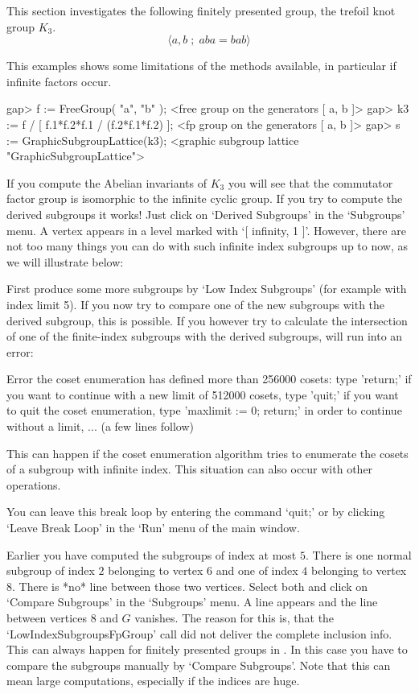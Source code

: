 
This  section  investigates the  following  finitely presented group, the
trefoil knot group $K_3$.
$$
    \langle a, b \;;\; aba = bab \rangle
$$

This examples shows some  limitations   of the methods available,   in
particular if infinite factors occur.

\begintt
gap> f := FreeGroup( "a", "b" );
<free group on the generators [ a, b ]>
gap> k3 := f / [ f.1*f.2*f.1 / (f.2*f.1*f.2) ];
<fp group on the generators [ a, b ]>
gap> s := GraphicSubgroupLattice(k3);
<graphic subgroup lattice "GraphicSubgroupLattice">
\endtt

If you  compute the Abelian invariants of  $K_3$ you will see that the
commutator factor  group is isomorphic to the   infinite cyclic group. 
If you try to  compute the derived subgroups it  works!  Just click on
`Derived Subgroups'  in the `Subgroups' menu. A  vertex appears in a
level marked with `[  infinity, 1 ]'. However,  there are not too many
things you can do with such infinite index subgroups up  to now, as we
will illustrate below:

First  produce some  more  subgroups  by  `Low Index Subgroups' (for
example with index limit 5). If you now try to compare  one of the new
subgroups with the derived subgroup,  this is possible. If you however
try to calculate the intersection of one of the finite-index subgroups
with the derived subgroups, {\GAP} will run into an error:

\begintt
Error the coset enumeration has defined more than 256000 cosets:
type 'return;' if you want to continue with a new limit of 512000 cosets,
type 'quit;' if you want to quit the coset enumeration,
type 'maxlimit := 0; return;' in order to continue without a limit,
...   (a few lines follow)
\endtt

This can happen if the coset enumeration algorithm tries to enumerate
the cosets of a subgroup with infinite index.  This situation can also
occur with other operations. 

You can leave this break loop by entering the command `quit;' or by
clicking `Leave Break Loop' in the `Run' menu of the main {\XGAP}
window.

Earlier you have computed the subgroups of index at most $5$.  There
is one normal subgroup of index $2$ belonging to vertex $6$ and one of
index $4$ belonging to vertex $8$. There is *no* line between those
two vertices. Select both and click on `Compare Subgroups' in the
`Subgroups' menu. A line appears and the line between vertices $8$ and
$G$ vanishes. The reason for this is, that the
`LowIndexSubgroupsFpGroup' call did not deliver the complete inclusion
info. This can always happen for finitely presented groups in {\XGAP}.
In this case you have to compare the subgroups manually by 
`Compare Subgroups'. Note that this can mean large computations, especially if
the indices are huge.

